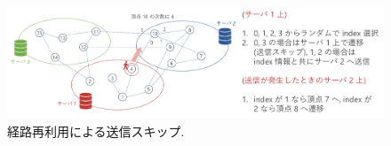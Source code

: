 \begin{figure}[t]
    \centering
    \includegraphics[scale=0.5]{figure/skip.pdf}
    \caption{経路再利用による送信スキップ.}
    \label{経路再利用による送信スキップ}
\end{figure}





